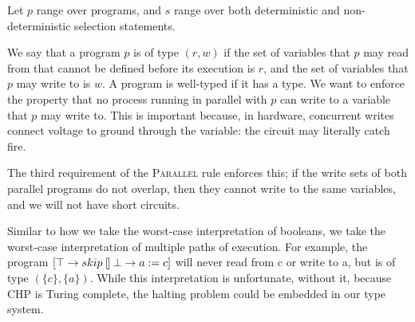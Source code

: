 \documentclass{article}
\begin{document}
Let $p$ range over programs, and $s$ range over both deterministic and
non-deterministic selection statements.

We say that a program $p$ is of type $(r, w)$ if the set of variables that $p$
may read from that cannot be defined before its execution is $r$, and the set of
variables that $p$ may write to is $w$.  A program is well-typed if it has a
type.  We want to enforce the property that no process running in parallel with
$p$ can write to a variable that $p$ may write to.  This is important because,
in hardware, concurrent writes connect voltage to ground through the variable:
the circuit may literally catch fire.

The third requirement of the \textsc{Parallel} rule enforces this; if the write
sets of both parallel programs do not overlap, then they cannot write to the
same variables, and we will not have short circuits.

Similar to how we take the worst-case interpretation of booleans, we take the
worst-case interpretation of multiple paths of execution.  For example, the
program $[\top \rightarrow skip \talloblong \bot \rightarrow a := c]$ will never
read from c or write to a, but is of type $(\{c\}, \{a\})$.  While this
interpretation is unfortunate, without it, because CHP is Turing complete, the
halting problem could be embedded in our type system.
\end{document}
